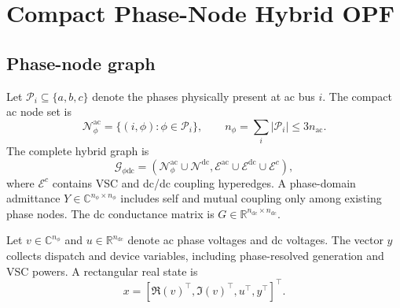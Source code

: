 \documentclass[journal,10pt]{IEEEtran}
\newcommand{\ac}{\mathrm{ac}}
\newcommand{\dc}{\mathrm{dc}}
\newcommand{\cN}{\mathcal{N}}
\newcommand{\cE}{\mathcal{E}}
\newcommand{\RR}{\mathbb{R}}
\newcommand{\CC}{\mathbb{C}}
\begin{document}
\section{Compact Phase-Node Hybrid OPF}
\subsection{Phase-node graph}
Let $\mathcal{P}_i\subseteq\{a,b,c\}$ denote the phases physically present at
ac bus $i$.  The compact ac node set is
\begin{equation}
  \cN^{\ac}_{\phi}=\{(i,\phi):\phi\in\mathcal{P}_i\},\qquad
  n_{\phi}=\sum_i |\mathcal{P}_i|\leq 3n_{\ac}.
  \label{eq:phase_nodes}
\end{equation}
The complete hybrid graph is
\begin{equation}
  \mathcal{G}_{\phi\dc}=
  (\cN^{\ac}_{\phi}\cup\cN^{\dc},
   \cE^{\ac}\cup\cE^{\dc}\cup\cE^{c}),
\end{equation}
where $\cE^c$ contains VSC and dc/dc coupling hyperedges.  A phase-domain
admittance $Y\in\CC^{n_\phi\times n_\phi}$ includes self and mutual coupling
only among existing phase nodes.  The dc conductance matrix is
$G\in\RR^{n_{\dc}\times n_{\dc}}$.

Let $v\in\CC^{n_\phi}$ and $u\in\RR^{n_\dc}$ denote ac phase voltages and dc
voltages.  The vector $y$ collects dispatch and device variables, including
phase-resolved generation and VSC powers.  A rectangular real state is
\begin{equation}
  x=[\Re(v)^\top,\Im(v)^\top,u^\top,y^\top]^\top.
\end{equation}
\end{document}
